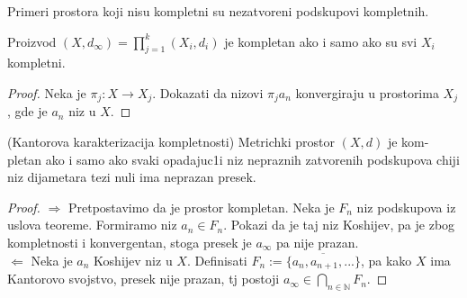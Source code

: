 \documentclass[a4paper,12pt]{article}
\newcommand{\NN}{\mathbb{N}}
\begin{document}
\begin{nap}
Primeri prostora koji nisu kompletni su nezatvoreni podskupovi kompletnih.
\end{nap}

\begin{tvr}
Proizvod $(X, d_{\infty}) = \prod_{j=1}^{k} (X_i, d_i)$ je kompletan ako i samo ako su svi $X_i$ kompletni.
\end{tvr}
\begin{proof}
Neka je $\pi_j : X \to X_j$. Dokazati da nizovi $\pi_j a_n$ konvergiraju u prostorima $X_j$, gde je $a_n$ niz u $X$.
\end{proof}

\begin{tma}
(Kantorova karakterizacija kompletnosti) Metrichki prostor $(X,d)$ je kom-pletan ako i samo ako svaki opadajuc1i niz nepraznih zatvorenih podskupova chiji niz dijametara tezi nuli ima neprazan presek.
\end{tma}
\begin{proof}
$\boxed{\Rightarrow}$ Pretpostavimo da je prostor kompletan. Neka je $F_n$ niz podskupova iz uslova teoreme. Formiramo niz $a_n \in F_n$. Pokazi da je taj niz Koshijev, pa je zbog kompletnosti i konvergentan, stoga presek je $a_{\infty}$ pa nije prazan. \\
$\boxed{\Leftarrow}$ Neka je $a_n$ Koshijev niz u $X$. Definisati $F_n := \overline{\{a_n ,a_{n+1}, ...\}}$, pa kako $X$ ima Kantorovo svojstvo, presek nije prazan, tj postoji $a_{\infty} \in \bigcap_{n \in \NN} F_n$.
\end{proof}
\end{document}
